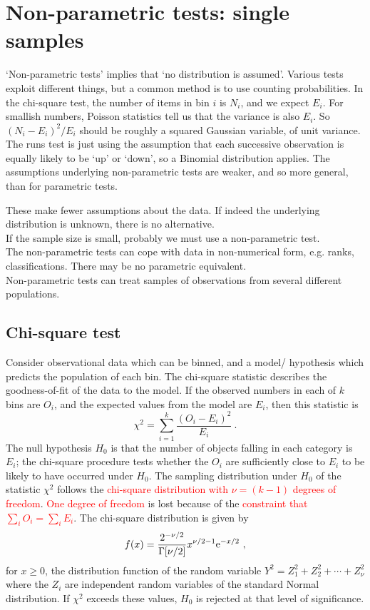 \documentclass[12pt,a4paper]{article}
\begin{document}
\section{Non-parametric tests: single samples}
`Non-parametric tests’ implies that ‘no distribution is assumed'. Various tests exploit different things, but a common method is to use counting probabilities. In the chi-square test, the number of items in bin $i$ is $N_i$, and we expect $E_i$. For smallish numbers, Poisson statistics tell us that the variance is also $E_i$. So $(N_i -E_i)^2/E_i$ should be roughly a squared Gaussian variable, of unit variance. The runs test is just using the assumption that each successive observation is equally likely to be `up' or `down', so a Binomial distribution applies. The assumptions underlying non-parametric tests are weaker, and so more general, than for parametric tests.

These make fewer assumptions about the data. If indeed the underlying distribution is unknown, there is no alternative. \\
If the sample size is small, probably we must use a non-parametric test. \\
The non-parametric tests can cope with data in non-numerical form, e.g. ranks, classifications. There may be no parametric equivalent. \\
Non-parametric tests can treat samples of observations from several different populations.

\subsection{Chi-square test}
Consider observational data which can be binned, and a model/ hypothesis which predicts the population of each bin. The chi-square statistic describes the goodness-of-fit of the data to the model. If the observed numbers in each of $k$ bins are $O_i$, and the expected values from the model are $E_i$, then this statistic is
\begin{equation}
\chi^2 = \sum_{i=1}^k \frac{(O_i -E_i)^2}{E_i} ~.
\end{equation}
The null hypothesis $H_0$ is that the number of objects falling in each category is $E_i$; the chi-square procedure tests whether the $O_i$ are sufficiently close to $E_i$ to be likely to have occurred under $H_0$. The sampling distribution under $H_0$ of the statistic $\chi^2$ follows the \textcolor{red}{chi-square distribution with $\nu = (k-1)$ degrees of freedom}. \textcolor{red}{One degree of freedom} is lost because of the \textcolor{red}{constraint that $\sum_i O_i = \sum_i E_i$}. The chi-square distribution is given by
\begin{equation}
f(x) = \frac{2^{-\nu/2}}{\Gamma[\nu/2]} x^{\nu/2-1} {\rm e}^{-x/2} ~,
\end{equation}
for $x \geqslant 0$, the distribution function of the random variable $Y^2 = Z_1^2 + Z_2^2 + \cdots + Z_\nu^2$ where the $Z_i$ are independent random variables of the standard Normal distribution. If $\chi^2$ exceeds these values, $H_0$ is rejected at that level of significance.
\end{document}
